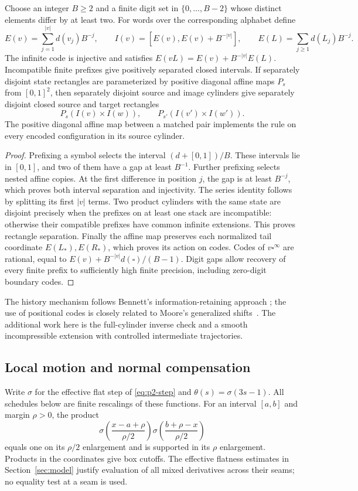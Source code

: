 \begin{lemma}\label{lem:sa-radix}
Choose an integer $B\ge2$ and a finite digit set in
$\{0,\ldots,B-2\}$ whose distinct elements differ by at least two.
For words over the corresponding alphabet define
\[
 E(v)=\sum_{j=1}^{|v|}d(v_j)B^{-j},\qquad
 I(v)=[E(v),E(v)+B^{-|v|}],\qquad
 E(L)=\sum_{j\ge1}d(L_j)B^{-j}.
\]
The infinite code is injective and satisfies
$E(vL)=E(v)+B^{-|v|}E(L)$.  Incompatible finite prefixes give
positively separated closed intervals.  If separately disjoint state
rectangles are parameterized by positive diagonal affine maps $P_s$
from $[0,1]^2$, then separately disjoint source and image cylinders give
separately disjoint closed source and target rectangles
\[
 P_s(I(v)\times I(w)),\qquad P_{s'}(I(v')\times I(w')).
\]
The positive diagonal affine map between a matched pair implements the
rule on every encoded configuration in its source cylinder.
\end{lemma}
\begin{proof}
Prefixing a symbol selects the interval $(d+[0,1])/B$.  These intervals
lie in $[0,1]$, and two of them have a gap at least $B^{-1}$.
Further prefixing selects nested affine copies.  At the first difference
in position $j$, the gap is at least $B^{-j}$, which proves both interval
separation and injectivity.  The series identity follows by splitting
its first $|v|$ terms.  Two product cylinders with the same state are
disjoint precisely when the prefixes on at least one stack are
incompatible: otherwise their compatible prefixes have common infinite
extensions.  This proves rectangle separation.  Finally the affine map
preserves each normalized tail coordinate $E(L_*),E(R_*)$, which proves
its action on codes.  Codes of $v\square^\infty$ are rational, equal to
$E(v)+B^{-|v|}d(\square)/(B-1)$.  Digit gaps allow recovery of every
finite prefix to sufficiently high finite precision, including zero-digit
boundary codes.
\end{proof}

The history mechanism follows Bennett's information-retaining approach
\cite{Bennett1973}; the use of positional codes is closely related to
Moore's generalized shifts~\cite{Moore1990,Moore1991}.  The additional
work here is the full-cylinder inverse check and a smooth incompressible
extension with controlled intermediate trajectories.

\subsection{Local motion and normal compensation}
Write $\sigma$ for the effective flat step of \eqref{eq:p2-step} and
$\theta(s)=\sigma(3s-1)$.  All schedules below are finite rescalings of
these functions.  For an interval $[a,b]$ and margin $\rho>0$, the product
\[
 \sigma\!\left(\frac{x-a+\rho}{\rho/2}\right)
 \sigma\!\left(\frac{b+\rho-x}{\rho/2}\right)
\]
equals one on its $\rho/2$ enlargement and is supported in its $\rho$
enlargement.  Products in the coordinates give box cutoffs.  The effective
flatness estimates in Section~\ref{sec:model} justify evaluation of all
mixed derivatives across their seams; no equality test at a seam is used.

